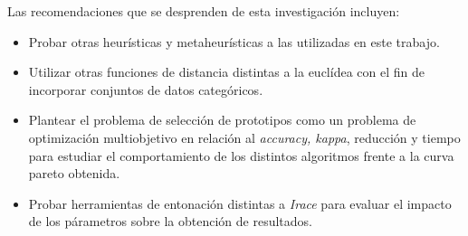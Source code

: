 Las recomendaciones que se desprenden de esta investigación incluyen: 

\begin{itemize}

\item Probar otras heurísticas y metaheurísticas a las utilizadas en este trabajo.

\item Utilizar otras funciones de distancia distintas a la euclídea con el fin de incorporar conjuntos de datos categóricos.

\item Plantear el problema de selección de prototipos como un problema de optimización multiobjetivo en relación al \emph{accuracy, kappa}, reducción y tiempo para estudiar el comportamiento de los distintos algoritmos frente a la curva pareto obtenida.

\item Probar herramientas de entonación distintas a \emph{Irace} para evaluar el impacto de los párametros sobre la obtención de resultados.

\end{itemize}

